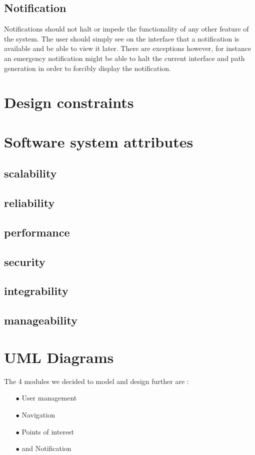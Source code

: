 \documentclass[english]{article}
\begin{document}
	\subsection{Notification}
Notifications should not halt or impede the functionality of any other feature of the system. The user should simply see on the interface that a notification is available and be able to view it later. There are exceptions however, for instance an emergency notification might be able to halt the current interface and path generation in order to forcibly display the notification. 
	\section{Design constraints}
	

	\section{Software system attributes}
	\subsection{scalability}
	\subsection{reliability}
	\subsection{performance}
	\subsection{security}
	\subsection{integrability}
	\subsection{manageability}
		
	\section{UML Diagrams}
	The 4 modules we decided to model and design further are :
	\begin{itemize}
		\item[$\bullet$] User management
		\item[$\bullet$] Navigation
		\item[$\bullet$] Points of interest
		\item[$\bullet$] and Notification
	\end{itemize}
\end{document}
